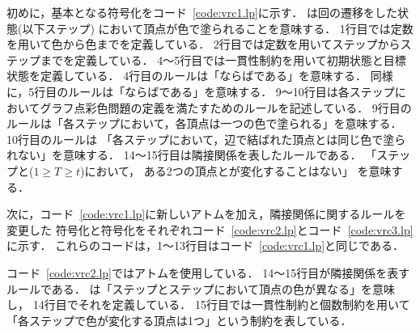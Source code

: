 初めに，基本となる符号化をコード~\ref{code:vrc1.lp}に示す．
は回の遷移をした状態(以下ステップ)
において頂点が色で塗られることを意味する．
1行目では定数を用いて色から色までを定義している．
2行目では定数を用いてステップからステップまでを定義している．
4～5行目では一貫性制約を用いて初期状態と目標状態を定義している．
4行目のルールは「ならばである」を意味する．
同様に，5行目のルールは「ならばである」を意味する．
9～10行目は各ステップにおいてグラフ点彩色問題の定義を満たすためのルールを記述している．
9行目のルールは「各ステップにおいて，各頂点は一つの色で塗られる」を意味する．
10行目のルールは
「各ステップにおいて，辺で結ばれた頂点とは同じ色で塗られない」を意味する．
14～15行目は隣接関係を表したルールである．
「ステップと($1 \geq T \geq t$)において，
ある2つの頂点とが変化することはない」
を意味する．



次に，コード~\ref{code:vrc1.lp}に新しいアトムを加え，隣接関係に関するルールを変更した
符号化と符号化をそれぞれコード~\ref{code:vrc2.lp}とコード~\ref{code:vrc3.lp}に示す．
これらのコードは，1～13行目はコード~\ref{code:vrc1.lp}と同じである．





コード~\ref{code:vrc2.lp}ではアトムを使用している．
14～15行目が隣接関係を表すルールである．
は「ステップとステップにおいて頂点の色が異なる」を意味し，
14行目でそれを定義している．
15行目では一貫性制約と個数制約を用いて「各ステップで色が変化する頂点は1つ」という制約を表している．

